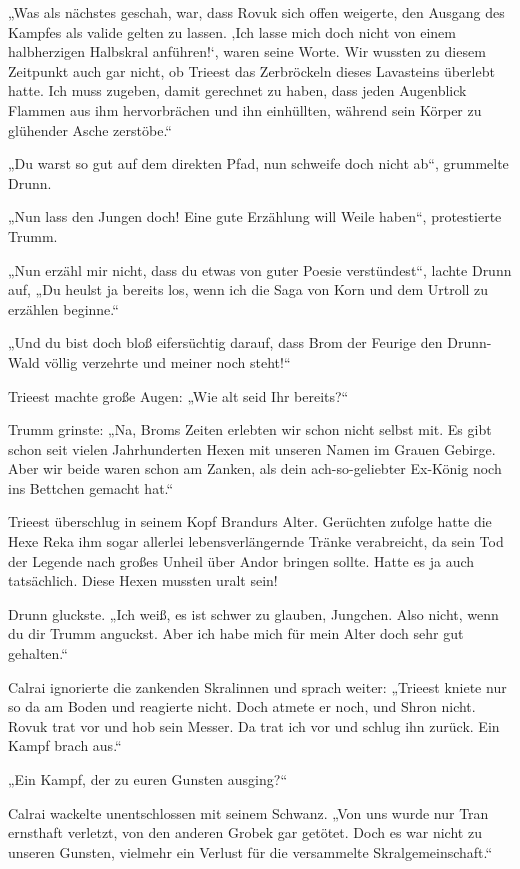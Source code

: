 „Was als nächstes geschah, war, dass Rovuk sich offen weigerte, den Ausgang des Kampfes als valide gelten zu lassen. ‚Ich lasse mich doch nicht von einem halbherzigen Halbskral anführen!‘, waren seine Worte. Wir wussten zu diesem Zeitpunkt auch gar nicht, ob Trieest das Zerbröckeln dieses Lavasteins überlebt hatte. Ich muss zugeben, damit gerechnet zu haben, dass jeden Augenblick Flammen aus ihm hervorbrächen und ihn einhüllten, während sein Körper zu glühender Asche zerstöbe.“

„Du warst so gut auf dem direkten Pfad, nun schweife doch nicht ab“, grummelte Drunn.

„Nun lass den Jungen doch! Eine gute Erzählung will Weile haben“, protestierte Trumm.

„Nun erzähl mir nicht, dass du etwas von guter Poesie verstündest“, lachte Drunn auf, „Du heulst ja bereits los, wenn ich die Saga von Korn und dem Urtroll zu erzählen beginne.“

„Und du bist doch bloß eifersüchtig darauf, dass Brom der Feurige den Drunn-Wald völlig verzehrte und meiner noch steht!“

Trieest machte große Augen: „Wie alt seid Ihr bereits?“

Trumm grinste: „Na, Broms Zeiten erlebten wir schon nicht selbst mit. Es gibt schon seit vielen Jahrhunderten Hexen mit unseren Namen im Grauen Gebirge. Aber wir beide waren schon am Zanken, als dein ach-so-geliebter Ex-König noch ins Bettchen gemacht hat.“

Trieest überschlug in seinem Kopf Brandurs Alter. Gerüchten zufolge hatte die Hexe Reka ihm sogar allerlei lebensverlängernde Tränke verabreicht, da sein Tod der Legende nach großes Unheil über Andor bringen sollte. Hatte es ja auch tatsächlich. Diese Hexen mussten uralt sein!

Drunn gluckste. „Ich weiß, es ist schwer zu glauben, Jungchen. Also nicht, wenn du dir Trumm anguckst. Aber ich habe mich für mein Alter doch sehr gut gehalten.“

Calrai ignorierte die zankenden Skralinnen und sprach weiter: „Trieest kniete nur so da am Boden und reagierte nicht. Doch atmete er noch, und Shron nicht. Rovuk trat vor und hob sein Messer. Da trat ich vor und schlug ihn zurück. Ein Kampf brach aus.“

„Ein Kampf, der zu euren Gunsten ausging?“

Calrai wackelte unentschlossen mit seinem Schwanz. „Von uns wurde nur Tran ernsthaft verletzt, von den anderen Grobek gar getötet. Doch es war nicht zu unseren Gunsten, vielmehr ein Verlust für die versammelte Skralgemeinschaft.“


